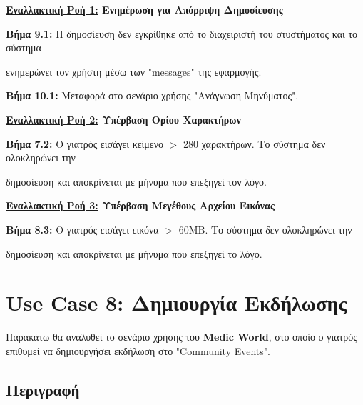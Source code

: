 \documentclass{article}
\begin{document}
\textbf{\underline{Εναλλακτική Ροή 1:} Ενημέρωση για Απόρριψη Δημοσίευσης} \vspace{0.2cm}
\par \textbf{Βήμα 9.1:} Η δημοσίευση δεν εγκρίθηκε από το διαχειριστή του στυστήματος και το σύστημα \par ενημερώνει τον χρήστη μέσω των "messages" της εφαρμογής. \vspace{0.1cm}
\par \textbf{Βήμα 10.1:} Μεταφορά στο σενάριο χρήσης "Ανάγνωση Μηνύματος".

\textbf{\underline{Εναλλακτική Ροή 2:} Υπέρβαση Ορίου Χαρακτήρων} \vspace{0.2cm}
\par \textbf{Βήμα 7.2:} Ο γιατρός εισάγει κείμενο $>$ 280 χαρακτήρων. Το σύστημα δεν ολοκληρώνει την \par δημοσίευση και αποκρίνεται με μήνυμα που επεξηγεί τον λόγο. \vspace{0.2cm}

\textbf{\underline{Εναλλακτική Ροή 3:} Υπέρβαση Μεγέθους Αρχείου Εικόνας} \vspace{0.2cm}
\par \textbf{Βήμα 8.3:} Ο γιατρός εισάγει εικόνα $>$ 60MB. Το σύστημα δεν ολοκληρώνει την \par δημοσίευση και αποκρίνεται με μήνυμα που επεξηγεί το λόγο.

\newpage

\section{Use Case 8: Δημιουργία Εκδήλωσης}

Παρακάτω θα αναλυθεί το σενάριο χρήσης του \textbf{Medic World}, στο οποίο ο γιατρός επιθυμεί να δημιουργήσει εκδήλωση στο "Community Events".

\subsection{Περιγραφή}
\end{document}
